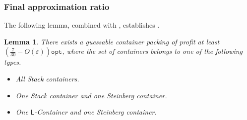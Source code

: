 \documentclass[10pt,a4paper]{amsart}
\newcommand{\kvnnew}[1]{\textcolor{black}{#1}}
\newcommand{\kvnr}[1]{}
\newcommand{\eps}{\varepsilon}
\renewcommand{\epsilon}{\varepsilon} %
\newcommand{\tdk}{\textsc{3DK}}
\newtheorem{theorem}{Theorem}[section]
\newtheorem{lemma}[theorem]{Lemma}
\theoremstyle{definition}
\newcommand{\opt}{\mathtt{opt}}
\newcommand{\LContainer}{$\mathsf{L}$-Container}
\begin{document}
\subsubsection{Final approximation ratio}

The following lemma, combined with , establishes .

\begin{lemma}
    There exists a guessable container packing of profit at least $\left(\frac{7}{30}-O(\eps)\right)\opt$, where the set of containers belongs to one of the following types.
    \begin{itemize}
        \item All \kvnnew{Stack} containers.
        \item One Stack container and one Steinberg container.
        \item One \LContainer{} and one Steinberg container.
    \end{itemize}
\end{lemma}
\end{document}
